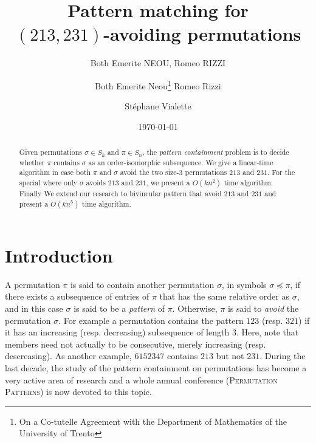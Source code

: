 \documentclass[a4paper]{llncs}
\begin{document}

\title{Pattern matching for\\ $(213,231)$-avoiding permutations}
\author{Both Emerite NEOU, Romeo RIZZI}
\date{}

\author{%
	Both Emerite Neou\thanks{On a Co-tutelle  Agreement with the Department of Mathematics of the University of Trento}
  Romeo Rizzi \and
  St\'ephane Vialette
}%

\date{\today}

\maketitle

\begin{abstract}
	Given permutations $\sigma \in S_k$ and $\pi \in S_n$, the
  \emph{pattern containment} problem is to decide whether $\pi$ contains
  $\sigma$ as an order-isomorphic subsequence.
	We give a linear-time algorithm in case both $\pi$ and $\sigma$ avoid
	the two size-$3$ permutations $213$ and $231$.
	For the special where only $\sigma$ avoids $213$ and $231$, we present a
	$O(kn^2)$ time algorithm. 
	Finally We extend our research to bivincular pattern that avoid $213$ and $231$
	 and present a $O(kn^5)$ time algorithm.
\end{abstract}



\section{Introduction}
\label{section:Introduction}

	A permutation $\pi$ is said to contain another permutation $\sigma$,
	in symbols $\sigma \preceq \pi$,
	if there exists a subsequence of entries of $\pi$ that has the same relative
	order as $\sigma$, and in this case $\sigma$ is said to be a
	\emph{pattern} of $\pi$.
	Otherwise, $\pi$ is said to \emph{avoid} the permutation $\sigma$.
	For example a permutation contains the pattern $123$ (resp. $321$) if it has
	an increasing (resp. decreasing) subsequence of length $3$.
	Here, note that members need not actually to be consecutive,
	merely increasing (resp. descreasing).
	As another example,
	$6152347$ contains $213$ but not $231$.
	During the last decade, the study of the pattern containment on permutations has
	become a very active area of research \cite{Kitaev:book:2011} and
	a whole annual conference (\textsc{Permutation Patterns}) is now devoted
	to this topic.
\end{document}
